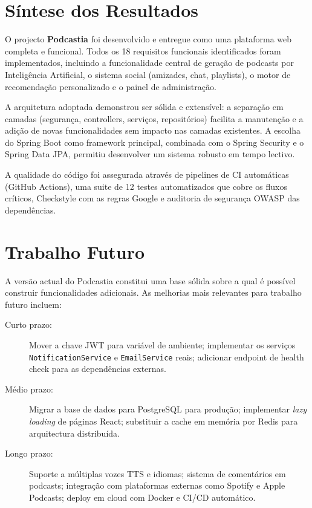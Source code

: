 \documentclass[12pt, a4paper]{report}
\begin{document}
\section{Síntese dos Resultados}

O projecto \textbf{Podcastia} foi desenvolvido e entregue como uma plataforma
web completa e funcional. Todos os 18 requisitos funcionais identificados foram
implementados, incluindo a funcionalidade central de geração de podcasts por
Inteligência Artificial, o sistema social (amizades, chat, playlists), o motor
de recomendação personalizado e o painel de administração.

A arquitetura adoptada demonstrou ser sólida e extensível: a separação em
camadas (segurança, controllers, serviços, repositórios) facilita a manutenção e
a adição de novas funcionalidades sem impacto nas camadas existentes. A escolha
do Spring Boot como framework principal, combinada com o Spring Security e o
Spring Data JPA, permitiu desenvolver um sistema robusto em tempo lectivo.

A qualidade do código foi assegurada através de pipelines de CI automáticas
(GitHub Actions), uma suite de 12 testes automatizados que cobre os fluxos
críticos, Checkstyle com as regras Google e auditoria de segurança OWASP das
dependências.

\section{Trabalho Futuro}

A versão actual do Podcastia constitui uma base sólida sobre a qual é possível
construir funcionalidades adicionais. As melhorias mais relevantes para trabalho
futuro incluem:

\begin{description}
  \item[Curto prazo:]
    Mover a chave JWT para variável de ambiente; implementar os serviços \texttt{NotificationService} e \texttt{EmailService} reais; adicionar endpoint de health check para as dependências externas.
  \item[Médio prazo:]
    Migrar a base de dados para PostgreSQL para produção; implementar \emph{lazy loading} de páginas React; substituir a cache em memória por Redis para arquitectura distribuída.
  \item[Longo prazo:]
    Suporte a múltiplas vozes TTS e idiomas; sistema de comentários em podcasts; integração com plataformas externas como Spotify e Apple Podcasts; deploy em cloud com Docker e CI/CD automático.
\end{description}
\end{document}
